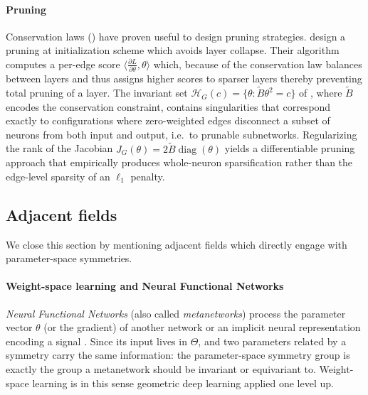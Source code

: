 \documentclass[mathematics,review,submit,moreauthors]{Definitions/mdpi}
\begin{document}
\paragraph{Pruning}
Conservation laws () have proven useful to design pruning strategies.
\citet{tanaka2020anips} design a pruning at initialization scheme which avoids layer collapse.
Their algorithm computes a per-edge score $\langle \frac{\partial L}{\partial \theta}, \theta \rangle$ which, because of the conservation law balances between layers and thus assigns higher scores to sparser layers thereby preventing total pruning of a layer.
The invariant set $\mathcal{H}_G(c)=\{\theta:\tilde{B}\theta^2=c\}$ of \citet{nurisso2025}, where $\tilde B$ encodes the conservation constraint, contains singularities that correspond exactly to configurations where zero-weighted edges disconnect a subset of neurons from both input and output, i.e.\ to prunable subnetworks.
Regularizing the rank of the Jacobian $J_G(\theta)=2\tilde{B}\operatorname{diag}(\theta)$ yields a differentiable pruning approach that empirically produces whole-neuron sparsification rather than the edge-level sparsity of an $\ell_1$ penalty.

\subsection{Adjacent fields}\label{sec:adjacent-fields}
We close this section by mentioning adjacent fields which directly engage with parameter-space symmetries.

\paragraph{Weight-space learning and Neural Functional Networks}
\emph{Neural Functional Networks}\citep{zhou2023} (also called \emph{metanetworks}) process the parameter vector $\theta$ (or the gradient) of another network or an implicit neural representation encoding a signal \citep[INR,][]{sitzmann2020anips}.
Since its input lives in $\Theta$, and two parameters related by a symmetry carry the same information: the parameter-space symmetry group is exactly the group a metanetwork should be invariant or equivariant to.
Weight-space learning is in this sense geometric deep learning applied one level up.
\end{document}
